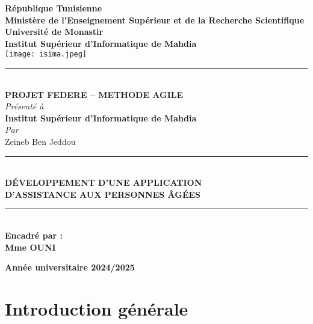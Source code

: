 \documentclass[12pt,a4paper]{report}
\begin{document}
\thispagestyle{empty} %

\centering

{\large \textbf{République Tunisienne}}\\[0.2cm]
{\large \textbf{Ministère de l’Enseignement Supérieur et de la Recherche Scientifique}}\\[0.2cm]
{\large \textbf{Université de Monastir}}\\[0.2cm]
{\large \textbf{Institut Supérieur d’Informatique de Mahdia}}\\[0.8cm]

\texttt{[image: isima.jpeg]}\\[0.8cm]

\textcolor{violet}{\rule{\linewidth}{1pt}}\\[0.8cm]

{\Huge \textbf{PROJET FEDERE – METHODE AGILE}}\\[1cm]

{\Large \textit{Présenté à}}\\[0.3cm]
{\Large \textbf{Institut Supérieur d’Informatique de Mahdia}}\\[1cm]

{\Large \textit{Par}}\\[0.3cm]
{\Large Zeineb Ben Jeddou  }

\rule{\linewidth}{0.5pt}\\
{\LARGE \textbf{DÉVELOPPEMENT D’UNE APPLICATION}}\\[0.3cm]
{\LARGE \textbf{D’ASSISTANCE AUX PERSONNES ÂGÉES}}\\
\rule{\linewidth}{0.5pt}\\[1cm]

{\Large \textbf{Encadré par :}}\\[0.3cm]
{\Large \textbf{Mme OUNI}}\\[2cm]

\vfill

{\large \textbf{Année universitaire 2024/2025}}

\newpage

\tableofcontents
\listoffigures
\listoftables

\newpage

\chapter*{Introduction générale}
\end{document}
